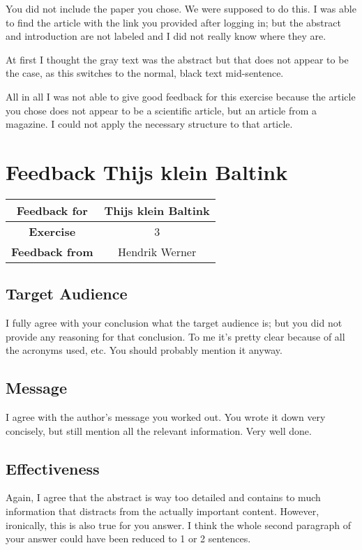 \documentclass[12pt, a4paper]{article}
\begin{document}
You did not include the paper you chose. We were supposed to do this. I was able to find the article with the link you provided after logging in; but the abstract and introduction are not labeled and I did not really know where they are.

At first I thought the gray text was the abstract but that does not appear to be the case, as this switches to the normal, black text mid-sentence.

All in all I was not able to give good feedback for this exercise because the article you chose does not appear to be a scientific article, but an article from a magazine. I could not apply the necessary structure to that article.

\clearpage
\section{Feedback Thijs klein Baltink}
\begin{tabular}{|c|c|}
	\hline
	\textbf{Feedback for} & Thijs klein Baltink\\\hline
	\textbf{Exercise} & 3\\\hline
	\textbf{Feedback from} & Hendrik Werner\\\hline
\end{tabular}

\subsection{Target Audience}
I fully agree with your conclusion what the target audience is; but you did not provide any reasoning for that conclusion. To me it's pretty clear because of all the acronyms used, etc. You should probably mention it anyway.

\subsection{Message}
I agree with the author's message you worked out. You wrote it down very concisely, but still mention all the relevant information. Very well done.

\subsection{Effectiveness}
Again, I agree that the abstract is way too detailed and contains to much information that distracts from the actually important content. However, ironically, this is also true for you answer. I think the whole second paragraph of your answer could have been reduced to 1 or 2 sentences.
\end{document}
